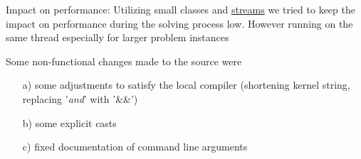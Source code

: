 \documentclass[a4paper, 12pt, bibliography=totoc]{scrartcl}
\begin{document}
Impact on performance:
Utilizing small classes and \href{http://www.cplusplus.com/reference/sstream/stringstream/}{streams} we tried to keep the impact on performance during the solving process low. However running on the same thread especially for larger problem instances 

Some non-functional changes made to the source were 
\begin{itemize}
	\item[a)] some adjustments to satisfy the local compiler (shortening kernel string, replacing '\emph{and}' with '\&\&')
	\item[b)] some explicit casts
	\item[c)] fixed documentation of command line arguments
\end{itemize}
\end{document}
